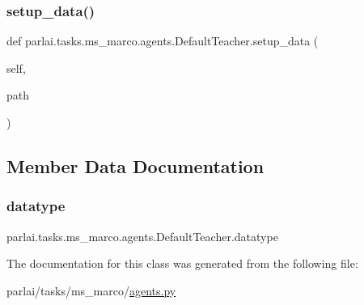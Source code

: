 \subsubsection{\texorpdfstring{setup\+\_\+data()}{setup\_data()}}
{\footnotesize\ttfamily def parlai.\+tasks.\+ms\+\_\+marco.\+agents.\+Default\+Teacher.\+setup\+\_\+data (\begin{DoxyParamCaption}\item[{}]{self,  }\item[{}]{path }\end{DoxyParamCaption})}



\subsection{Member Data Documentation}
\mbox{\label{classparlai_1_1tasks_1_1ms__marco_1_1agents_1_1DefaultTeacher_abcedf76bc126510edfe336ab60b76a58}} 
\subsubsection{\texorpdfstring{datatype}{datatype}}
{\footnotesize\ttfamily parlai.\+tasks.\+ms\+\_\+marco.\+agents.\+Default\+Teacher.\+datatype}



The documentation for this class was generated from the following file\+:\begin{DoxyCompactItemize}
\item 
parlai/tasks/ms\+\_\+marco/\hyperlink{parlai_2tasks_2ms__marco_2agents_8py}{agents.\+py}\end{DoxyCompactItemize}
